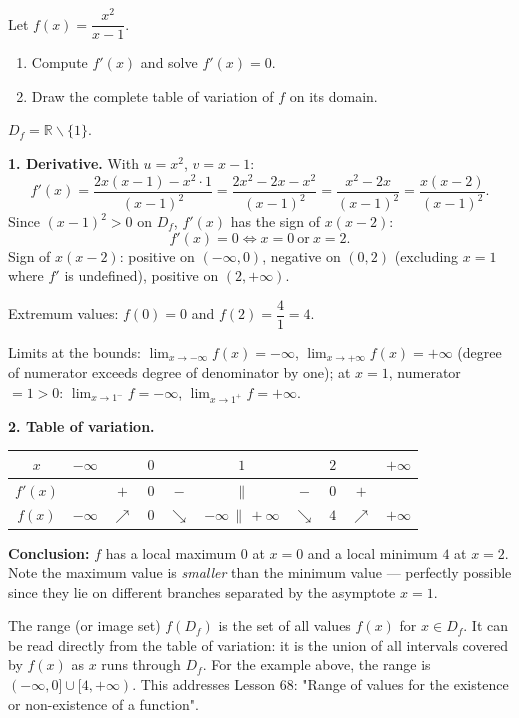\documentclass[11pt]{article}
\newcommand{\cle}[1]{{\popxbold\color{popdark}#1}}
\def\setminus{\mathbin{\backslash}}\let\smallsetminus\setminus
\begin{document}
\begin{exemplebox}
Let $f(x) = \dfrac{x^2}{x - 1}$.
\begin{enumerate}
\item Compute $f'(x)$ and solve $f'(x) = 0$.
\item Draw the complete table of variation of $f$ on its domain.
\end{enumerate}
\tcblower
$D_f = \mathbb{R}\setminus\{1\}$.

\textbf{1. Derivative.} With $u = x^2$, $v = x - 1$:
\[ f'(x) = \frac{2x(x-1) - x^2 \cdot 1}{(x-1)^2} = \frac{2x^2 - 2x - x^2}{(x-1)^2} = \frac{x^2 - 2x}{(x-1)^2} = \frac{x(x-2)}{(x-1)^2}. \]
Since $(x-1)^2 > 0$ on $D_f$, $f'(x)$ has the sign of $x(x-2)$:
\[ f'(x) = 0 \iff x = 0 \ \text{or}\ x = 2. \]
Sign of $x(x-2)$: positive on $(-\infty, 0)$, negative on $(0, 2)$ (excluding $x=1$ where $f'$ is undefined), positive on $(2, +\infty)$.

Extremum values: $f(0) = 0$ and $f(2) = \dfrac{4}{1} = 4$.

Limits at the bounds: $\lim_{x\to-\infty} f(x) = -\infty$, $\lim_{x\to+\infty} f(x) = +\infty$ (degree of numerator exceeds degree of denominator by one); at $x = 1$, numerator $= 1 > 0$: $\lim_{x\to1^-} f = -\infty$, $\lim_{x\to1^+} f = +\infty$.

\textbf{2. Table of variation.}
\begin{center}
\begin{tabular}{|c|ccccccccc|}
\hline
$x$ & $-\infty$ & & $0$ & & $1$ & & $2$ & & $+\infty$ \\
\hline
$f'(x)$ & & $+$ & $0$ & $-$ & $\|$ & $-$ & $0$ & $+$ & \\
\hline
$f(x)$ & $-\infty$ & $\nearrow$ & $0$ & $\searrow$ & $-\infty\,\|\,+\infty$ & $\searrow$ & $4$ & $\nearrow$ & $+\infty$ \\
\hline
\end{tabular}
\end{center}
\textbf{Conclusion:} $f$ has a \cle{local maximum} $0$ at $x = 0$ and a \cle{local minimum} $4$ at $x = 2$. Note the maximum value is \emph{smaller} than the minimum value — perfectly possible since they lie on different branches separated by the asymptote $x = 1$.
\end{exemplebox}

\begin{savaistu}
The \cle{range} (or image set) $f(D_f)$ is the set of all values $f(x)$ for $x \in D_f$. It can be read directly from the table of variation: it is the union of all intervals covered by $f(x)$ as $x$ runs through $D_f$. For the example above, the range is $(-\infty, 0] \cup [4, +\infty)$. This addresses Lesson 68: "Range of values for the existence or non-existence of a function".
\end{savaistu}
\end{document}
